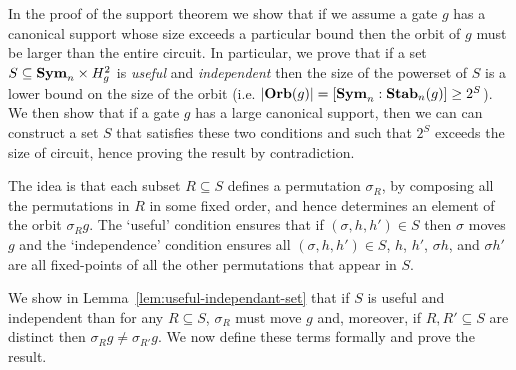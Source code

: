 \documentclass[../paper.tex]{subfiles}
\begin{document}

In the proof of the support theorem we show that if we assume a gate $g$ has a
canonical support whose size exceeds a particular bound then the orbit of $g$
must be larger than the entire circuit. In particular, we prove that if a set $S
\subseteq \text{\textbf{Sym}}_n \times H^2_g$ is \emph{useful} and \emph{independent} then the
size of the powerset of $S$ is a lower bound on the size of the orbit (i.e.
$\vert \text{\textbf{Orb}}(g) \vert = [\text{\textbf{Sym}}_n : \text{\textbf{Stab}}_n(g)] \geq 2^S$). We then show that if a
gate $g$ has a large canonical support, then we can can construct a set $S$ that
satisfies these two conditions and such that $2^S$ exceeds the size of circuit,
hence proving the result by contradiction.

The idea is that each subset $R \subseteq S$ defines a permutation $\sigma_R$,
by composing all the permutations in $R$ in some fixed order, and hence
determines an element of the orbit $\sigma_Rg$. The `useful' condition ensures
that if $(\sigma, h, h') \in S$ then $\sigma$ moves $g$ and the `independence'
condition ensures all $(\sigma, h, h') \in S$, $h$, $h'$, $\sigma h$, and
$\sigma h'$ are all fixed-points of all the other permutations that appear in
$S$.

We show in Lemma~\ref{lem:useful-independant-set} that if $S$ is useful and
independent than for any $R \subseteq S$, $\sigma_R$ must move $g$ and,
moreover, if $R, R' \subseteq S$ are distinct then $\sigma_Rg \neq \sigma_{R'}
g$. We now define these terms formally and prove the result.




\end{document}
